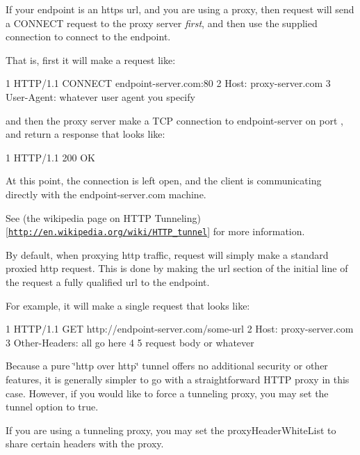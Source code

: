 If your endpoint is an {\ttfamily https} url, and you are using a proxy, then request will send a {\ttfamily C\+O\+N\+N\+E\+C\+T} request to the proxy server {\itshape first}, and then use the supplied connection to connect to the endpoint.

That is, first it will make a request like\+:


\begin{DoxyCode}
1 HTTP/1.1 CONNECT endpoint-server.com:80
2 Host: proxy-server.com
3 User-Agent: whatever user agent you specify
\end{DoxyCode}


and then the proxy server make a T\+C\+P connection to {\ttfamily endpoint-\/server} on port {}, and return a response that looks like\+:


\begin{DoxyCode}
1 HTTP/1.1 200 OK
\end{DoxyCode}


At this point, the connection is left open, and the client is communicating directly with the {\ttfamily endpoint-\/server.\+com} machine.

See (the wikipedia page on H\+T\+T\+P Tunneling)\mbox{[}\href{http://en.wikipedia.org/wiki/HTTP_tunnel}{\tt http\+://en.\+wikipedia.\+org/wiki/\+H\+T\+T\+P\+\_\+tunnel}\mbox{]} for more information.

By default, when proxying {\ttfamily http} traffic, request will simply make a standard proxied {\ttfamily http} request. This is done by making the {\ttfamily url} section of the initial line of the request a fully qualified url to the endpoint.

For example, it will make a single request that looks like\+:


\begin{DoxyCode}
1 HTTP/1.1 GET http://endpoint-server.com/some-url
2 Host: proxy-server.com
3 Other-Headers: all go here
4 
5 request body or whatever
\end{DoxyCode}


Because a pure \char`\"{}http over http\char`\"{} tunnel offers no additional security or other features, it is generally simpler to go with a straightforward H\+T\+T\+P proxy in this case. However, if you would like to force a tunneling proxy, you may set the {\ttfamily tunnel} option to {\ttfamily true}.

If you are using a tunneling proxy, you may set the {\ttfamily proxy\+Header\+White\+List} to share certain headers with the proxy.

